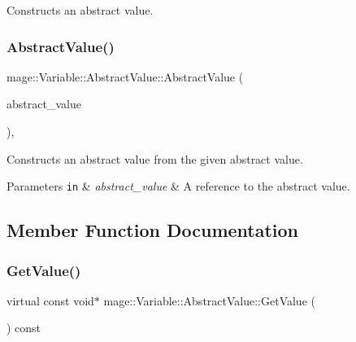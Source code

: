 Constructs an abstract value. \hypertarget{structmage_1_1_variable_1_1_abstract_value_a09123ab568948a1a8bc7911c65fda422}{}\label{structmage_1_1_variable_1_1_abstract_value_a09123ab568948a1a8bc7911c65fda422} 
\subsubsection{\texorpdfstring{Abstract\+Value()}{AbstractValue()}\hspace{0.1cm}{\footnotesize\ttfamily [2/2]}}
{\footnotesize\ttfamily mage\+::\+Variable\+::\+Abstract\+Value\+::\+Abstract\+Value (\begin{DoxyParamCaption}\item[{const \hyperlink{structmage_1_1_variable_1_1_abstract_value}{Abstract\+Value} \&}]{abstract\+\_\+value }\end{DoxyParamCaption})\hspace{0.3cm}{\ttfamily [protected]}, {\ttfamily [default]}}

Constructs an abstract value from the given abstract value.


\begin{DoxyParams}[1]{Parameters}
\mbox{\tt in}  & {\em abstract\+\_\+value} & A reference to the abstract value. \\
\hline
\end{DoxyParams}


\subsection{Member Function Documentation}
\hypertarget{structmage_1_1_variable_1_1_abstract_value_aede2a77b571b80794a4254e34144f4c1}{}\label{structmage_1_1_variable_1_1_abstract_value_aede2a77b571b80794a4254e34144f4c1} 
\subsubsection{\texorpdfstring{Get\+Value()}{GetValue()}}
{\footnotesize\ttfamily virtual const void$\ast$ mage\+::\+Variable\+::\+Abstract\+Value\+::\+Get\+Value (\begin{DoxyParamCaption}{ }\end{DoxyParamCaption}) const\hspace{0.3cm}{\ttfamily [pure virtual]}}

